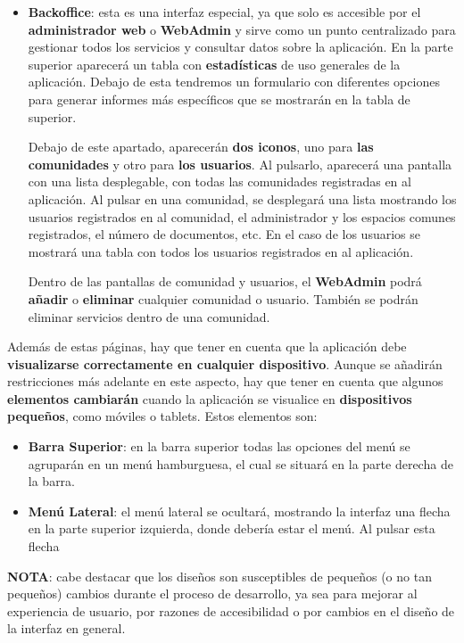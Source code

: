 \begin{appendices}
\begin{itemize}
	\item \textbf{Backoffice}: esta es una interfaz especial, ya que solo es accesible por el \textbf{administrador web} o \textbf{WebAdmin} y sirve como un punto centralizado para gestionar todos los servicios y consultar datos sobre la aplicación.
	En la parte superior aparecerá un tabla con \textbf{estadísticas} de uso generales de la aplicación. Debajo de esta tendremos un formulario con diferentes opciones para generar informes más específicos que se mostrarán en la tabla de superior.
	
	Debajo de este apartado, aparecerán \textbf{dos iconos}, uno para \textbf{las comunidades} y otro para \textbf{los usuarios}. Al pulsarlo, aparecerá una pantalla con una lista desplegable, con todas las comunidades registradas en al aplicación. Al pulsar en una comunidad, se desplegará una lista mostrando los usuarios registrados en al comunidad, el administrador y los espacios comunes registrados, el número de documentos, etc. En el caso de los usuarios se mostrará una tabla con todos los usuarios registrados en al aplicación.
	
	Dentro de las pantallas de comunidad y usuarios, el \textbf{WebAdmin} podrá \textbf{añadir} o \textbf{eliminar} cualquier comunidad o usuario. También se podrán eliminar servicios dentro de una comunidad.
\end{itemize}

Además de estas páginas, hay que tener en cuenta que la aplicación debe \textbf{visualizarse correctamente en cualquier dispositivo}. Aunque se añadirán restricciones más adelante en este aspecto, hay que tener en cuenta que algunos \textbf{elementos cambiarán} cuando la aplicación se visualice en \textbf{dispositivos pequeños}, como móviles o tablets. Estos elementos son:

\begin{itemize}
	\item \textbf{Barra Superior}: en la barra superior todas las opciones del menú se agruparán en un \gls{menú hamburguesa}, el cual se situará en la parte derecha de la barra.
	
	\item \textbf{Menú Lateral}: el menú lateral se ocultará, mostrando la interfaz una flecha en la parte superior izquierda, donde debería estar el menú. Al pulsar esta flecha 
\end{itemize}


\textbf{NOTA}: cabe destacar que los diseños son susceptibles de pequeños (o no tan pequeños) cambios durante el proceso de desarrollo, ya sea para mejorar al experiencia de usuario, por razones de accesibilidad o por cambios en el diseño de la interfaz
en general.


\end{appendices}
